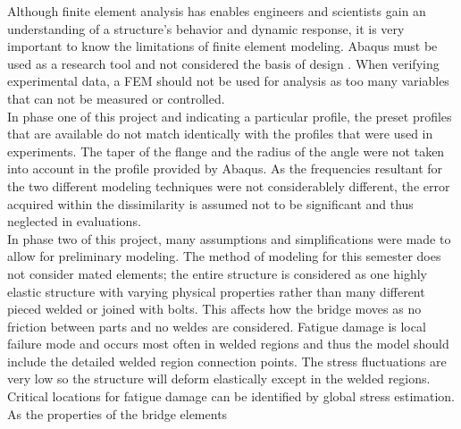 \indent Although finite element analysis has enables engineers and scientists gain an understanding of a structure’s behavior and dynamic response, it is very important to know the limitations of finite element modeling. Abaqus must be used as a research tool and not considered the basis of design \cite{Abaqus}. When verifying experimental data, a FEM should not be used for analysis as too many variables that can not be measured or controlled. \\
\indent In phase one of this project and indicating a particular profile, the preset profiles that are available do not match identically with the profiles that were used in experiments. The taper of the flange and the radius of the angle were not taken into account in the profile provided by Abaqus. As the frequencies resultant for the two different modeling techniques were not considerablely different, the error acquired within the dissimilarity is assumed not to be significant and thus neglected in evaluations. \\
\indent In phase two of this project, many assumptions and simplifications were made to allow for preliminary modeling. The method of modeling for this semester does not consider mated elements; the entire structure is considered as one highly elastic structure with varying physical properties rather than many different pieced welded or joined with bolts. This affects how the bridge moves as no friction between parts and no weldes are considered. 
\indent Fatigue damage is local failure mode and occurs most often in welded regions and thus the model should include the detailed welded region connection points. The stress fluctuations are very low so the structure will deform elastically except in the welded regions. Critical locations for fatigue damage can be identified by global stress estimation. As the properties of the bridge elements \cite{manoj}\\


  


